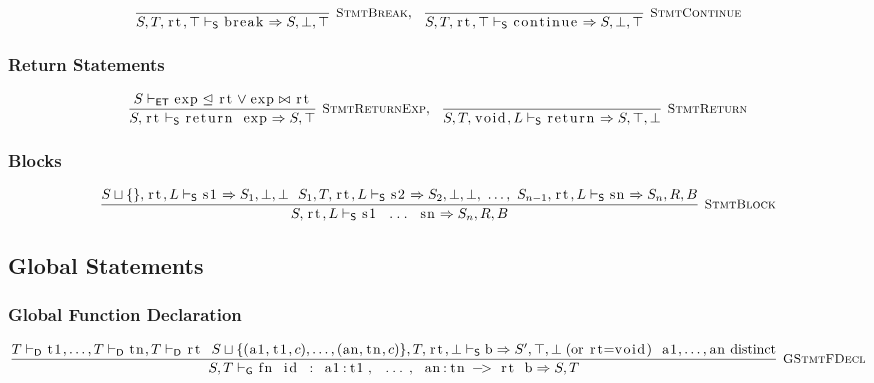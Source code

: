 \documentclass{article}
\newcommand{\code}[1]{\lstinline[columns=fixed]{#1}}
\newcommand{\drmrule}[5]{\frac{#1}{#2\vdash_{\mathsf{#3}}#4}\textsc{\ \small{#5}}}
\newcommand{\ruleapp}[1]{\vdash_{\mathsf{#1}}}
\newcommand{\mc}[1]{\textnormal{\code{#1}}}
\begin{document}
				\begin{align*}
					\drmrule{}{S,T,\mc{rt},\top}{S}{\mc{break} \Rightarrow S,\bot,\top}{StmtBreak},\ \ 
					\drmrule{}{S,T,\mc{rt},\top}{S}{\mc{continue} \Rightarrow S,\bot,\top}{StmtContinue}
				\end{align*}
			
			\subsubsection{Return Statements}
			
				\begin{align*}
					\drmrule{S\ruleapp{ET}\mc{exp}\trianglelefteq\mc{rt}\vee\mc{exp}\bowtie\mc{rt}}{S,\mc{rt}}{S}{\mc{return exp} \Rightarrow S,\top}{StmtReturnExp},\ \  \drmrule{}{S,T,\mc{void},L}{S}{\mc{return}\Rightarrow S,\top,\bot}{StmtReturn}
				\end{align*}
				
			\subsubsection{Blocks}
			
				\begin{align*}
					\drmrule{S\sqcup\{\},\mc{rt},L\ruleapp{S}\mc{s1} \Rightarrow S_1,\bot,\bot\ \ S_1,T,\mc{rt},L\ruleapp{S}\mc{s2} \Rightarrow S_2,\bot,\bot,\ \dots,\ S_{n-1},\mc{rt},L\ruleapp{S}\mc{sn} \Rightarrow S_n,R,B}{S,\mc{rt},L}{S}{\mc{s1 ... sn} \Rightarrow S_n,R,B}{StmtBlock}
				\end{align*}
		
		\subsection{Global Statements}
		
			\subsubsection{Global Function Declaration}
			
				\begin{align*}
					\drmrule{T\ruleapp{D}\mc{t1},\dots,T\ruleapp{D}\mc{tn},T\ruleapp{D}\mc{rt}\ \ S\sqcup\{(\mc{a1},\mc{t1},c),\dots,(\mc{an},\mc{tn},c)\},T,\mc{rt},\bot\ruleapp{S} \mc{b} \Rightarrow S',\top,\bot\;(\textnormal{or \code{rt=void}}) \ \ \mc{a1},\dots,\mc{an} \textnormal{ distinct}}{S,T}{G}{\mc{fn id : a1:t1, ..., an:tn -> rt b} \Rightarrow S,T}{GStmtFDecl}
				\end{align*}
			
\end{document}
